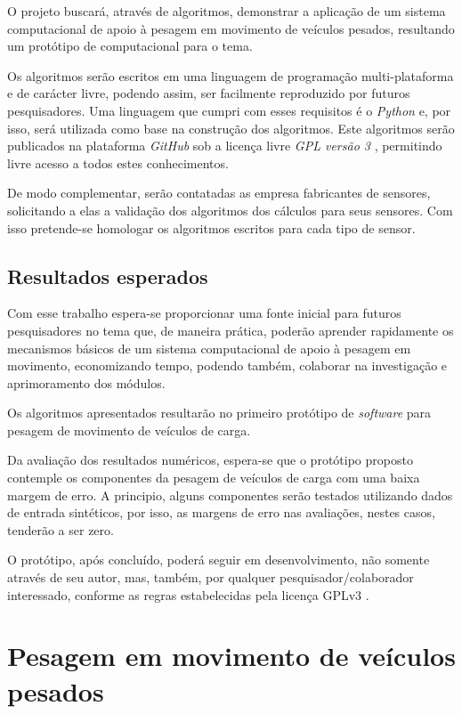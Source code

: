 \documentclass{ufscThesis}
\begin{document}
O projeto buscará, através de algoritmos, demonstrar a aplicação de um sistema computacional de apoio à pesagem em movimento de veículos pesados, resultando um protótipo de computacional para o tema.

Os algoritmos serão escritos em uma linguagem de programação multi-plataforma e de carácter livre, podendo assim, ser facilmente reproduzido por futuros pesquisadores. Uma linguagem que cumpri com esses requisitos é o \textit{Python} e, por isso, será utilizada como base na construção dos algoritmos. Este algoritmos serão publicados na plataforma \textit{GitHub} sob a licença livre \textit{GPL versão 3} \cite{web:gplv3}, permitindo livre acesso a todos estes conhecimentos.

De modo complementar, serão contatadas as empresa fabricantes de sensores, solicitando a elas a validação dos algoritmos dos cálculos para seus sensores. Com isso pretende-se homologar os algoritmos escritos para cada tipo de sensor.

\section{Resultados esperados}\label{introducao-resultados}
Com esse trabalho espera-se proporcionar uma fonte inicial para futuros pesquisadores no tema que, de maneira prática, poderão aprender rapidamente os mecanismos básicos de um sistema computacional de apoio à pesagem em movimento, economizando tempo, podendo também, colaborar na investigação e aprimoramento dos módulos.

Os algoritmos apresentados resultarão no primeiro protótipo de \textit{software} para pesagem de movimento de veículos de carga.

Da avaliação dos resultados numéricos, espera-se que o protótipo proposto contemple os componentes da pesagem de veículos de carga com uma baixa margem de erro. A principio, alguns componentes serão testados utilizando dados de entrada sintéticos, por isso, as margens de erro nas avaliações, nestes casos, tenderão a ser zero.

O protótipo, após concluído, poderá seguir em desenvolvimento, não somente através de seu autor, mas, também, por qualquer pesquisador/colaborador interessado, conforme as regras estabelecidas pela licença GPLv3 \cite{web:gplv3}.

\chapter{Pesagem em movimento de veículos pesados}\label{wim}
\end{document}
